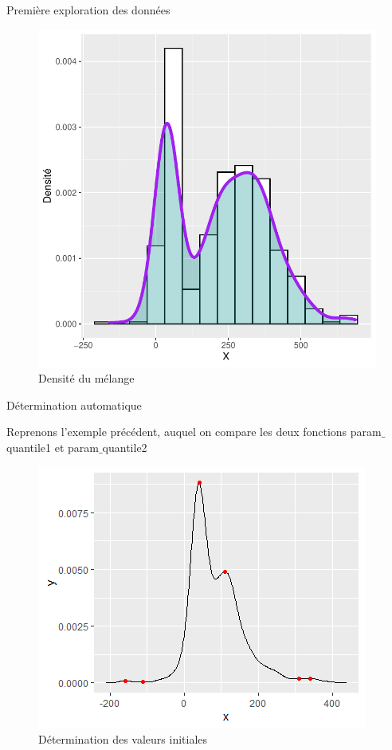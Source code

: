\documentclass[11pt]{beamer}
\begin{document}
	\begin{frame}{Première exploration des données}
		\begin{figure}[H]
			\centering
			\includegraphics[scale=0.4]{dens1.pdf}
			\caption{Densité du mélange}
		\end{figure}
	\end{frame}

	
	\begin{frame}{Détermination automatique}
	\scriptsize
		\begin{block}{}
			Reprenons l'exemple précédent, auquel on compare les deux fonctions param$\_$quantile1 et param$\_$quantile2
		\end{block}
		\begin{figure}[H]
			\centering
			\includegraphics[scale=0.5]{images/param_kmeans_image.png}
			\caption{Détermination des valeurs initiales}
		\end{figure}
	\end{frame}
\end{document}
